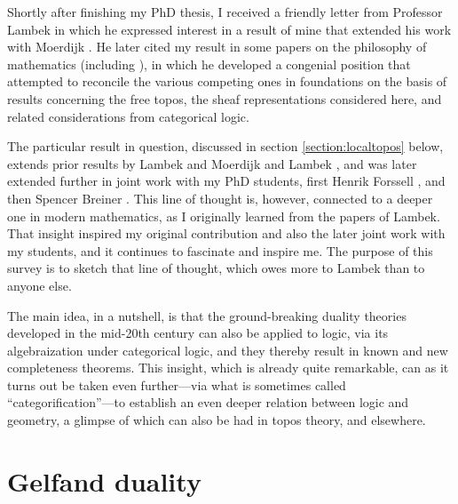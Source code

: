 \documentclass[graybox]{svmult}
\begin{document}
Shortly after finishing my PhD thesis, I received a friendly letter from Professor Lambek in which he expressed interest in a result of mine that extended his work with Moerdijk \cite{LM}. He later cited my result in some papers on the philosophy of mathematics (including \cite{L1,L2}), in which he developed a congenial position that attempted to reconcile the various competing ones in foundations on the basis of results concerning the free topos, the sheaf representations considered here, and related considerations from categorical logic.    

The particular result in question, discussed in section \ref{section:localtopos} below, extends prior results by Lambek and Moerdijk \cite{LM} and Lambek \cite{L2}, and was later extended further in joint work with my  PhD students, first Henrik Forssell \cite{AF, For}, and then Spencer Breiner \cite{AB,B}.  This line of thought is, however, connected to a deeper one in modern mathematics, as I originally learned from the papers of Lambek.  That insight inspired  my  original contribution and also the later joint work with my students, and it continues to fascinate and inspire me.   The purpose of this survey is to sketch that line of thought, which owes more to Lambek than to anyone else.  

The main idea, in a nutshell, is that the ground-breaking duality theories developed in the mid-20th century can also be applied to logic, via its algebraization under categorical logic, and they thereby result in known and new completeness theorems.  This insight, which is already quite remarkable, can as it turns out be taken even further---via what is sometimes called ``categorification''---to establish an even deeper relation between logic and geometry, a glimpse of which can also be had in topos theory, and elsewhere.

\section{Gelfand duality}
\end{document}
